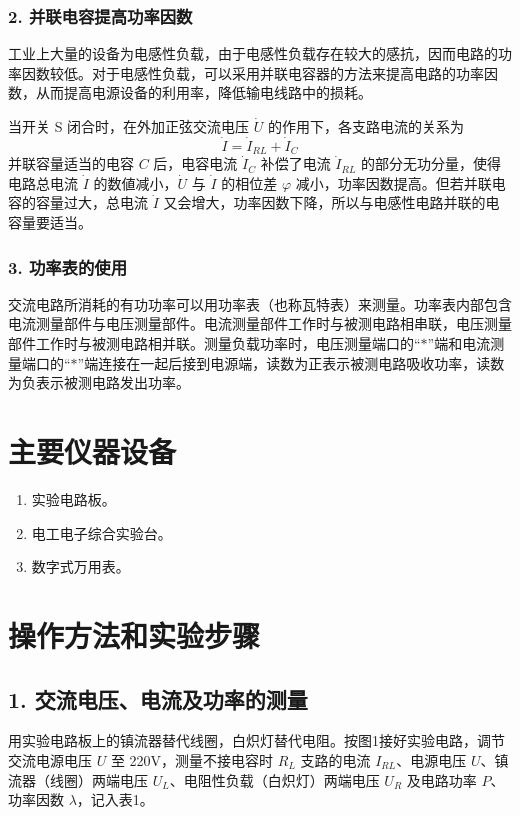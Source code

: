 \documentclass[10.5pt]{config}
\begin{document}
\subsubsection*{2. 并联电容提高功率因数}

工业上大量的设备为电感性负载，由于电感性负载存在较大的感抗，因而电路的功率因数较低。对于电感性负载，可以采用并联电容器的方法来提高电路的功率因数，从而提高电源设备的利用率，降低输电线路中的损耗。

当开关 S 闭合时，在外加正弦交流电压 $\dot{U}$ 的作用下，各支路电流的关系为
\begin{equation*}
    \dot{I} = \dot{I}_{RL} + \dot{I}_C
\end{equation*}
并联容量适当的电容 $C$ 后，电容电流 $\dot{I}_C$ 补偿了电流 $\dot{I}_{RL}$ 的部分无功分量，使得电路总电流 $\dot{I}$ 的数値减小，$\dot{U}$ 与 $\dot{I}$ 的相位差 $\varphi$ 减小，功率因数提高。但若并联电容的容量过大，总电流 $\dot{I}$ 又会增大，功率因数下降，所以与电感性电路并联的电容量要适当。

\subsubsection*{3. 功率表的使用}

交流电路所消耗的有功功率可以用功率表（也称瓦特表）来测量。功率表内部包含电流测量部件与电压测量部件。电流测量部件工作时与被测电路相串联，电压测量部件工作时与被测电路相并联。测量负载功率时，电压测量端口的“$*$”端和电流测量端口的“$*$”端连接在一起后接到电源端，读数为正表示被测电路吸收功率，读数为负表示被测电路发出功率。



\section{主要仪器设备}
\begin{enumerate}[label=\arabic*., leftmargin=2em]
    \item 实验电路板。
    \item 电工电子综合实验台。
    \item 数字式万用表。

\end{enumerate}

\section{操作方法和实验步骤}

\subsection*{1. 交流电压、电流及功率的测量}
用实验电路板上的镇流器替代线圈，白炽灯替代电阻。按图1接好实验电路，调节交流电源电压 $U$ 至 220V，测量不接电容时 $R_L$ 支路的电流 $I_{RL}$、电源电压 $U$、镇流器（线圈）两端电压 $U_L$、电阻性负载（白炽灯）两端电压 $U_R$ 及电路功率 $P$、功率因数 $\lambda$，记入表1。
\end{document}
